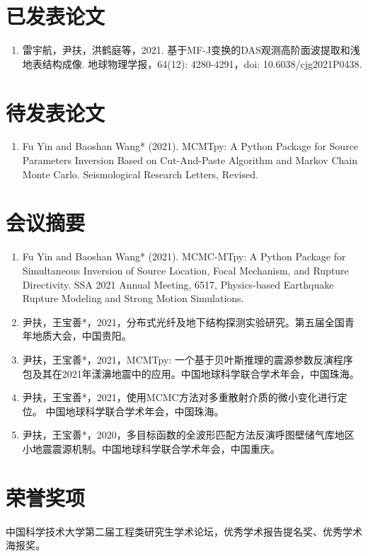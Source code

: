 
\begin{publications}

\section*{已发表论文}

\begin{enumerate}
\item   雷宇航，尹扶，洪鹤庭等，2021. 基于MF-J变换的DAS观测高阶面波提取和浅地表结构成像. 地球物理学报，64(12): 4280-4291，doi: 10.6038/cjg2021P0438.
\end{enumerate}



\section*{待发表论文}

\begin{enumerate}
\item Fu Yin and Baoshan Wang* (2021). MCMTpy: A Python Package 
for Source Parameters Inversion Based on Cut-And-Paste Algorithm 
and Markov Chain Monte Carlo. Seismological Research Letters, Revised.
\end{enumerate}

\section*{会议摘要}
\begin{enumerate}
\item Fu Yin and Baoshan Wang* (2021). MCMC-MTpy: A Python Package for Simultaneous Inversion of Source Location, Focal Mechanism, and Rupture Directivity. SSA 2021 Annual Meeting, 6517, Physics-based Earthquake Rupture Modeling and Strong Motion Simulations.
\item 尹扶，王宝善*，2021，分布式光纤及地下结构探测实验研究。第五届全国青年地质大会，中国贵阳。
\item 尹扶，王宝善*，2021，MCMTpy: 一个基于贝叶斯推理的震源参数反演程序包及其在2021年漾濞地震中的应用。中国地球科学联合学术年会，中国珠海。
\item 尹扶，王宝善*，2021，使用MCMC方法对多重散射介质的微小变化进行定位。 中国地球科学联合学术年会，中国珠海。
\item 尹扶，王宝善*，2020，多目标函数的全波形匹配方法反演呼图壁储气库地区小地震震源机制。中国地球科学联合学术年会，中国重庆。
\end{enumerate}

\section*{荣誉奖项}
中国科学技术大学第二届工程类研究生学术论坛，优秀学术报告提名奖、优秀学术海报奖。

\end{publications}
